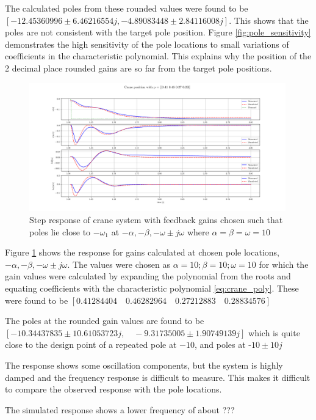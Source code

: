 \documentclass{article}
\begin{document}
The calculated poles from these rounded values were found to be $[-12.45360996 \pm 6.46216554j, -4.89083448 \pm 2.84116008j]$.
This shows that the poles are not consistent with the target pole position.
Figure \ref{fig:pole_sensitivity} demonstrates the high sensitivity of the pole locations to small variations of coefficients in the characteristic polynomial.
This explains why the position of the 2 decimal place rounded gains are so far from the target pole positions.

\begin{figure}[H]
  \centering
  \includegraphics[width=0.99\textwidth]{figures/3.4b.png}
  \caption{Step response of crane system with feedback gains chosen such that poles lie close to $-\omega_1$ at $-\alpha, -\beta, -\omega \pm j\omega$ where $\alpha = \beta = \omega = 10$}
  \label{fig:exp3.4b}
\end{figure}

Figure \ref{fig:exp3.4b} shows the response for gains calculated at chosen pole locations, $-\alpha, -\beta, -\omega \pm j\omega$.
The values were chosen as $\alpha = 10; \beta= 10; \omega = 10$ for which the gain values were calculated by expanding the polynomial from the roots and equating
coefficients with the characteristic polynomial \ref{eq:crane_poly}.
These were found to be $[0.41284404 \quad 0.46282964 \quad 0.27212883 \quad 0.28834576]$

The poles at the rounded gain values are found to be $[-10.34437835 \pm 10.61053723j, \quad -9.31735005 \pm 1.90749139j]$ 
which is quite close to the design point of a repeated pole at $-10$, and poles at -$10\pm 10j$

The response shows some oscillation components, but the system is highly damped and the frequency response is difficult to measure.
This makes it difficult to compare the observed response with the pole locations.

The simulated response shows a lower frequency of about ???
\end{document}
